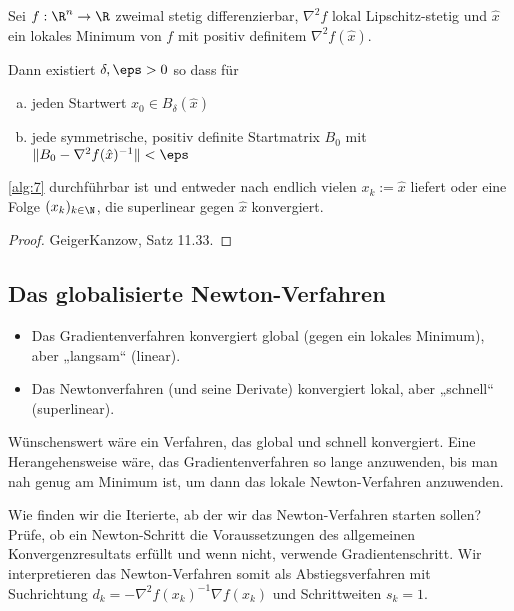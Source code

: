 \begin{alg} \label{alg:7}
	\begin{algorithmic}
		\EndWhile
	\end{algorithmic}
\end{alg}

\begin{st} \label{2.56}
	Sei $f: \R^n \to \R$ zweimal stetig differenzierbar, $\nabla^2 f$ lokal Lipschitz-stetig und $\hat x$ ein lokales Minimum von $f$ mit positiv definitem $\nabla^2 f(\hat x)$.

	Dann existiert $\delta, \eps > 0$ so dass für
	\begin{enumerate}[(a)]
		\item
			jeden Startwert $x_0 \in B_\delta(\hat x)$
		\item
			jede symmetrische, positiv definite Startmatrix $B_0$ mit $\|B_0 - \nabla^2 f(\hat x)^{-1}\| < \eps$
	\end{enumerate}
	\ref{alg:7} durchführbar ist und entweder nach endlich vielen $x_k := \hat x$ liefert oder eine Folge $(x_k)_{k\in \N}$, die superlinear gegen $\hat x$ konvergiert.
	\begin{proof}
		GeigerKanzow, Satz 11.33.
	\end{proof}
\end{st}

\subsection{Das globalisierte Newton-Verfahren}

\begin{itemize}
	\item
		Das Gradientenverfahren konvergiert global (gegen ein lokales Minimum), aber „langsam“ (linear).
	\item
		Das Newtonverfahren (und seine Derivate) konvergiert lokal, aber „schnell“ (superlinear).
\end{itemize}
Wünschenswert wäre ein Verfahren, das global und schnell konvergiert.
Eine Herangehensweise wäre, das Gradientenverfahren so lange anzuwenden, bis man nah genug am Minimum ist, um dann das lokale Newton-Verfahren anzuwenden.

Wie finden wir die Iterierte, ab der wir das Newton-Verfahren starten sollen?
Prüfe, ob ein Newton-Schritt die Voraussetzungen des allgemeinen Konvergenzresultats erfüllt und wenn nicht, verwende Gradientenschritt.
Wir interpretieren das Newton-Verfahren somit als Abstiegsverfahren mit Suchrichtung $d_k = - \nabla^2 f(x_k)^{-1} \nabla f(x_k)$ und Schrittweiten $s_k = 1$.

